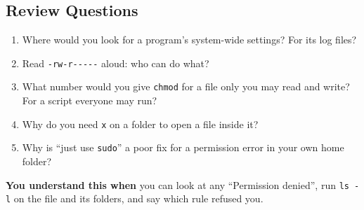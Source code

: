 \subsection*{Review Questions}\label{03-files-folders-and-who-may-touch-them:review-questions}

\begin{enumerate}
\def\labelenumi{\arabic{enumi}.}
\tightlist
\item
  Where would you look for a program's system-wide settings? For its log files?
\item
  Read \texttt{-rw-r-\/-\/-\/-\/-} aloud: who can do what?
\item
  What number would you give \texttt{chmod} for a file only you may read and write? For a script everyone may run?
\item
  Why do you need \texttt{x} on a folder to open a file inside it?
\item
  Why is ``just use \texttt{sudo}'' a poor fix for a permission error in your own home folder?
\end{enumerate}

\begin{understandbox}

\textbf{You understand this when} you can look at any ``Permission denied'', run \texttt{ls\ -l} on the file and its folders, and say which rule refused you.

\end{understandbox}
